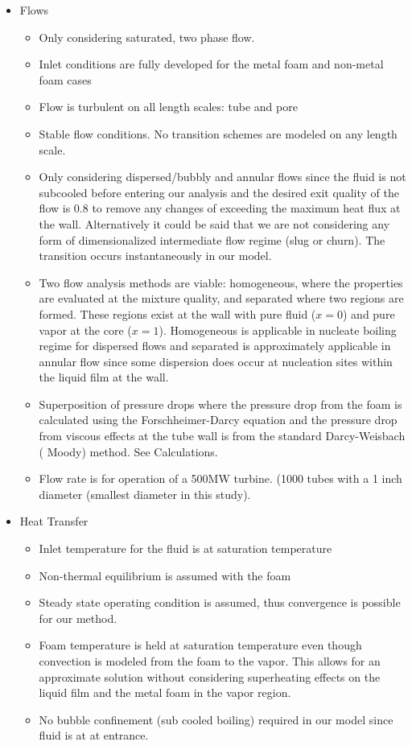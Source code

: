 \documentclass[compileTAMUreport.tex]{subfiles}
\begin{document}
\begin{itemize}
\item Flows
	\begin{itemize}
		\item 	Only considering saturated, two phase flow.
		\item 	Inlet conditions are fully developed for the metal foam and non-metal foam cases
		\item 	Flow is turbulent on all length scales: tube and pore \cite{Incropera}
		\item 	Stable flow conditions. No transition schemes are modeled on any length scale.
		\item 	Only considering dispersed/bubbly and annular flows since the fluid is not subcooled before entering our analysis and the desired exit quality of the flow is 0.8 to remove any changes of exceeding the maximum heat flux at the wall. 
		Alternatively it could be said that we are not considering any form of dimensionalized intermediate flow regime (slug or churn). The transition occurs instantaneously in our model.
		\item	Two flow analysis methods are viable: homogeneous, where the properties are evaluated at the mixture quality, and separated where two regions are formed. These regions exist at the wall with pure fluid ($x=0$) and pure vapor at the core ($x=1$).
		Homogeneous is applicable in nucleate boiling regime for dispersed flows and separated is approximately applicable in annular flow since some dispersion does occur at nucleation sites within the liquid film at the wall.
	\item 	Superposition of pressure drops where the pressure drop from the foam is calculated using the Forschheimer-Darcy equation and the pressure drop from viscous effects at the tube wall is from the standard Darcy-Weisbach (
	Moody) method. See Calculations.
	\item Flow rate is for operation of a 500MW turbine. (1000 tubes with a 1 inch diameter (smallest diameter in this study).
	\end{itemize}

\item Heat Transfer
	\begin{itemize}
		\item 	Inlet temperature for the fluid is at saturation temperature
		\item 	Non-thermal equilibrium is assumed with the foam\cite{Xu2011}
		\item 	Steady state operating condition is assumed, thus convergence is possible for our method.
		\item 	Foam temperature is held at saturation temperature even though convection is modeled from the foam to the vapor. This allows for an approximate solution without considering superheating effects on the liquid film and the metal foam in the vapor region.
		\item 	No bubble confinement  (sub cooled boiling) required in our model since fluid is at \Tsat at entrance.
	\end{itemize}
\end{itemize}
\end{document}
